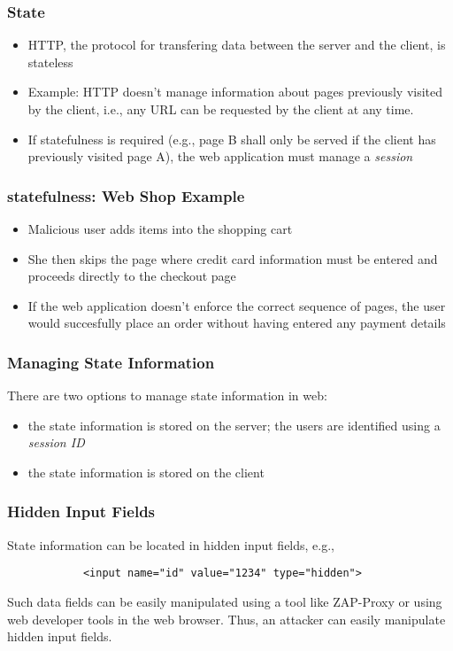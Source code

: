 \begin{frame}
    \frametitle{State}
        \begin{itemize}
        \item HTTP, the protocol for transfering data between the server and the client, is stateless
        \item Example: HTTP doesn't manage information about pages previously visited by the client, i.e., any URL can be requested by the client at any time. 
        \item If statefulness is required (e.g., page B shall only be served if the client has previously visited page A), the web application must manage a \textit{session}
    \end{itemize}
\end{frame}

\begin{frame}
    \frametitle{statefulness: Web Shop Example}
    \begin{itemize}
        \item Malicious user adds items into the shopping cart
        \item She then skips the page where credit card information must be entered and proceeds directly to the checkout page
        \item If the web application doesn't enforce the correct sequence of pages, the user would succesfully place an order without having entered any payment details 
    \end{itemize}
\end{frame}

\begin{frame}
    \frametitle{Managing State Information}
    There are two options to manage state information in web:
    \begin{itemize}
        \item the state information is stored on the server; the users are identified using a \textit{session ID}
        \item the state information is stored on the client
    \end{itemize}
\end{frame}

\begin{frame}[fragile]
    \frametitle{Hidden Input Fields}
    State information can be located in hidden input fields, e.g., 
    \begin{center}
        \begin{verbatim}
            <input name="id" value="1234" type="hidden">        
        \end{verbatim}
    \end{center}

    Such data fields can be easily manipulated using a tool like ZAP-Proxy or using web developer tools in the web browser. Thus, an attacker can easily manipulate hidden input fields. 
\end{frame}

